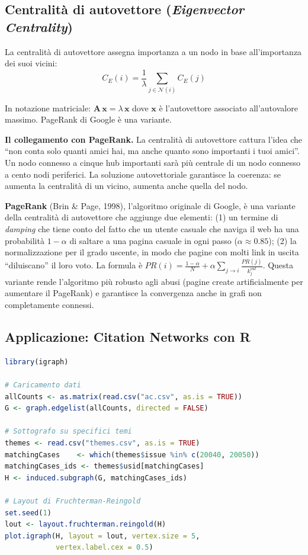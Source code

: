 \documentclass[12pt,a4paper]{article}
\newcommand{\formula}[1]{%
  \begin{equation*}#1\end{equation*}%
}
\begin{document}
\subsection{Centralità di autovettore (\textit{Eigenvector Centrality})}

La centralità di autovettore assegna importanza a un nodo in base all'importanza dei suoi
vicini:
\formula{C_E(i) = \frac{1}{\lambda} \sum_{j \in \mathcal{N}(i)} C_E(j)}
In notazione matriciale: $\mathbf{A}\,\mathbf{x} = \lambda\,\mathbf{x}$ dove $\mathbf{x}$
è l'autovettore associato all'autovalore massimo. PageRank di Google è una variante.

\noindent\textbf{Il collegamento con PageRank.}
La centralità di autovettore cattura l'idea che ``non conta solo quanti amici hai, ma anche
quanto sono importanti i tuoi amici''. Un nodo connesso a cinque hub importanti sarà più
centrale di un nodo connesso a cento nodi periferici. La soluzione autovettoriale garantisce
la coerenza: se aumenta la centralità di un vicino, aumenta anche quella del nodo.

\textbf{PageRank} (Brin \& Page, 1998), l'algoritmo originale di Google, è una variante della
centralità di autovettore che aggiunge due elementi: (1) un termine di \emph{damping} che
tiene conto del fatto che un utente casuale che naviga il web ha una probabilità $1-\alpha$
di saltare a una pagina casuale in ogni passo ($\alpha \approx 0.85$); (2) la normalizzazione
per il grado uscente, in modo che pagine con molti link in uscita ``diluiscano'' il loro
voto. La formula è $PR(i) = \frac{1-\alpha}{N} + \alpha \sum_{j \to i} \frac{PR(j)}{k_j^{out}}$.
Questa variante rende l'algoritmo più robusto agli abusi (pagine create artificialmente
per aumentare il PageRank) e garantisce la convergenza anche in grafi non completamente
connessi.

\subsection{Applicazione: Citation Networks con R}

\begin{lstlisting}[language=R]
library(igraph)

# Caricamento dati
allCounts <- as.matrix(read.csv("ac.csv", as.is = TRUE))
G <- graph.edgelist(allCounts, directed = FALSE)

# Sottografo su specifici temi
themes <- read.csv("themes.csv", as.is = TRUE)
matchingCases    <- which(themes$issue %in% c(20040, 20050))
matchingCases_ids <- themes$usid[matchingCases]
H <- induced.subgraph(G, matchingCases_ids)

# Layout di Fruchterman-Reingold
set.seed(1)
lout <- layout.fruchterman.reingold(H)
plot.igraph(H, layout = lout, vertex.size = 5,
            vertex.label.cex = 0.5)
\end{lstlisting}
\end{document}
